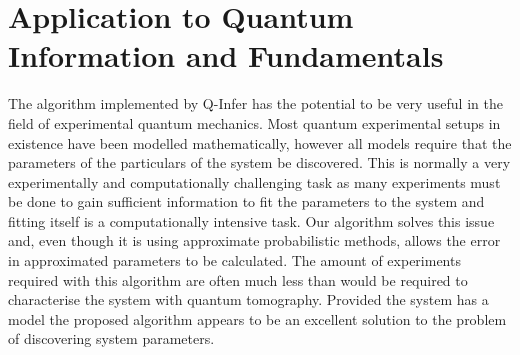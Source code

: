 \section{Application to Quantum Information and Fundamentals}
The algorithm implemented by Q-Infer has the potential to be very useful in the field of experimental quantum mechanics. Most quantum experimental setups in existence have been modelled mathematically, however all models require that the parameters of the particulars of the system be discovered. This is normally a very experimentally and computationally challenging task as many experiments must be done to gain sufficient information to fit the parameters to the system and fitting itself is a computationally intensive task. Our algorithm solves this issue and, even though it is using approximate probabilistic methods, allows the error in approximated parameters to be calculated. The amount of experiments required with this algorithm are often much less than would be required to characterise the system with quantum tomography. Provided the system has a model the proposed algorithm appears to be an excellent solution to the problem of discovering system parameters. 


